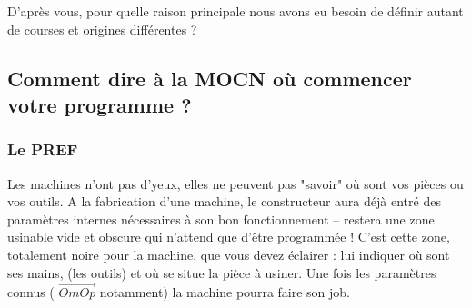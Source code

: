 \documentclass[12pt]{article}
\newcounter{exo}
\newenvironment{exo}{\stepcounter{exo}\vspace{0.5cm}{\bfseries Question \theexo\ :}}{\par\vspace{0.5cm}}
\begin{document}
\begin{exo}\label{exo1} D'après vous, pour quelle raison principale nous avons eu besoin de définir autant de courses et origines différentes ? \end{exo}




\subsection{Comment dire à la MOCN où commencer votre programme ?}
\subsubsection{Le PREF}

\begin{tcolorbox}[colback=blue!5!white,colframe=red!75!black]
  \bcinfo Les machines n'ont pas d'yeux, elles ne peuvent pas "savoir" où sont vos pièces ou vos outils. A la fabrication d'une machine, le constructeur aura déjà entré des paramètres internes nécessaires à son bon fonctionnement -- restera une zone usinable vide et obscure qui n'attend que d'être programmée ! C'est cette zone, totalement noire pour la machine, que vous devez éclairer : lui indiquer où sont ses mains, (les outils) et où se situe la pièce à usiner. Une fois les paramètres connus ( $\overrightarrow{OmOp}$ notamment) la machine pourra faire son job. 
\end{tcolorbox}
\end{document}
